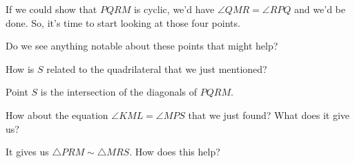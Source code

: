 

If we could show that $PQRM$ is cyclic, we'd have $\angle QMR = \angle RPQ$ and we'd be done. So, it's time to start looking at those four points.

Do we see anything notable about these points that might help?

How is $S$ related to the quadrilateral that we just mentioned?









Point $S$ is the intersection of the diagonals of $PQRM$.

How about the equation $\angle KML = \angle MPS$ that we just found? What does it give us?



It gives us $\triangle PRM \sim \triangle MRS.$ How does this help?

